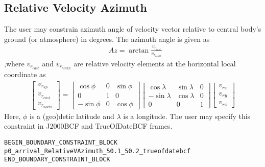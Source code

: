 \documentclass[11pt]{article}
\begin{document}
\subsection{Relative Velocity Azimuth}
\label{subsec:relativevelocity_azimuth}
The user may constrain azimuth angle of velocity vector relative to central body's ground (or atmosphere) in degrees. The azimuth angle is given as
\begin{equation}
	\label{eq:rel_velocity_Az}
	\begin{aligned}
		&Az = \arctan{\frac{v_{r_{east}}}{v_{r_{north}}}}
	\end{aligned}
\end{equation}
,where $v_{r_{east}}$ and $v_{r_{north}}$ are relative velocity elements at the horizontal local coordinate as
\begin{equation}
	\label{eq:rel_velocity_local}
	\begin{aligned}
		\begin{bmatrix}
		v_{r_{up}}\\
		v_{r_{east}}\\
		v_{r_{north}}
		\end{bmatrix} =
		\begin{bmatrix}
		\cos{\phi} & 0 & \sin{\phi}\\
		0 & 1 & 0\\
		-\sin{\phi} & 0 & \cos{\phi}
		\end{bmatrix}
		\begin{bmatrix}
		\cos{\lambda} & \sin{\lambda} & 0\\
		-\sin{\lambda}& \cos{\lambda} & 0\\
		0 & 0 & 1
		\end{bmatrix}
		\begin{bmatrix}
		v_{rx}\\
		v_{ry}\\
		v_{rz}
		\end{bmatrix}
	\end{aligned}
\end{equation}
Here, $\phi$ is a (geo)detic latitude and $\lambda$ is a longitude. The user may specify this constraint in J2000BCF and TrueOfDateBCF frames.

\begin{verbatim}
BEGIN_BOUNDARY_CONSTRAINT_BLOCK
p0_arrival_RelativeVAzimuth_50.1_50.2_trueofdatebcf
END_BOUNDARY_CONSTRAINT_BLOCK
\end{verbatim}
\end{document}
